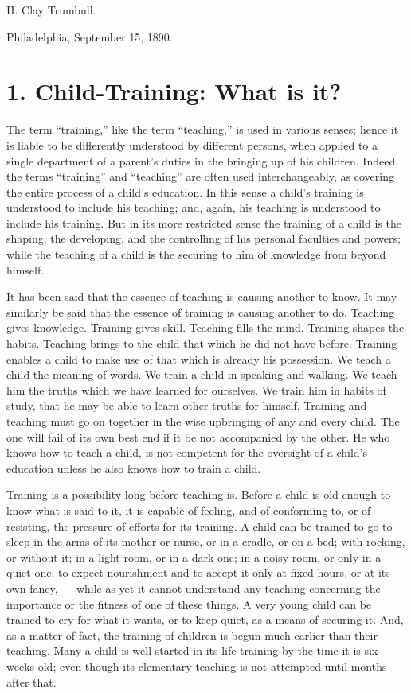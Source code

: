 \documentclass[
]{book}
\begin{document}
H. Clay Trumbull.

Philadelphia, September 15, 1890.

\hypertarget{child-training-what-is-it}{%
\chapter{1. Child-Training: What is it?}\label{child-training-what-is-it}}

The term ``training,'' like the term ``teaching,'' is used in various senses; hence it is liable to be differently understood by different persons, when applied to a single department of a parent's duties in the bringing up of his children. Indeed, the terms ``training'' and ``teaching'' are often used interchangeably, as covering the entire process of a child's education. In this sense a child's training is understood to include his teaching; and, again, his teaching is understood to include his training. But in its more restricted sense the training of a child is the shaping, the developing, and the controlling of his personal faculties and powers; while the teaching of a child is the securing to him of knowledge from beyond himself.

It has been said that the essence of teaching is causing another to know. It may similarly be said that the essence of training is causing another to do. Teaching gives knowledge. Training gives skill. Teaching fills the mind. Training shapes the habits. Teaching brings to the child that which he did not have before. Training enables a child to make use of that which is already his possession. We teach a child the meaning of words. We train a child in speaking and walking. We teach him the truths which we have learned for ourselves. We train him in habits of study, that he may be able to learn other truths for himself. Training and teaching must go on together in the wise upbringing of any and every child. The one will fail of its own best end if it be not accompanied by the other. He who knows how to teach a child, is not competent for the oversight of a child's education unless he also knows how to train a child.

Training is a possibility long before teaching is. Before a child is old enough to know what is said to it, it is capable of feeling, and of conforming to, or of resisting, the pressure of efforts for its training. A child can be trained to go to sleep in the arms of its mother or nurse, or in a cradle, or on a bed; with rocking, or without it; in a light room, or in a dark one; in a noisy room, or only in a quiet one; to expect nourishment and to accept it only at fixed hours, or at its own fancy, --- while as yet it cannot understand any teaching concerning the importance or the fitness of one of these things. A very young child can be trained to cry for what it wants, or to keep quiet, as a means of securing it. And, as a matter of fact, the training of children is begun much earlier than their teaching. Many a child is well started in its life-training by the time it is six weeks old; even though its elementary teaching is not attempted until months after that.
\end{document}
